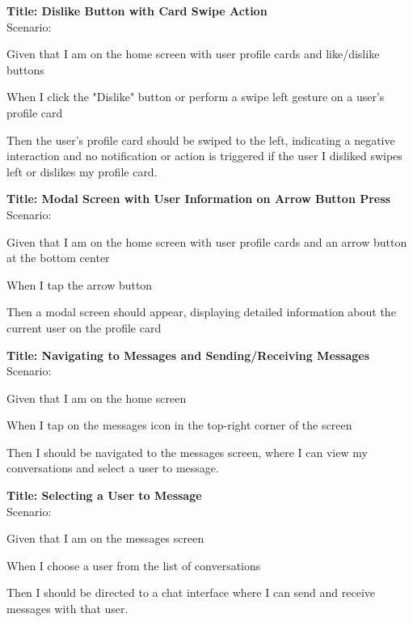 \bigskip
\textbf{Title: Dislike Button with Card Swipe Action} \\
Scenario:
\begin{compactitem}
    \item Given that I am on the home screen with user profile cards and like/dislike buttons
    \item When I click the "Dislike" button or perform a swipe left gesture on a user's profile card
    \item Then the user's profile card should be swiped to the left, indicating a negative interaction and no notification or action is triggered if the user I disliked swipes left or dislikes my profile card.
\end{compactitem}

\bigskip
\textbf{Title: Modal Screen with User Information on Arrow Button Press} \\
Scenario:
\begin{compactitem}
    \item Given that I am on the home screen with user profile cards and an arrow button at the bottom center
    \item When I tap the arrow button
    \item Then a modal screen should appear, displaying detailed information about the current user on the profile card
\end{compactitem}

\bigskip
\textbf{Title: Navigating to Messages and Sending/Receiving Messages} \\
Scenario:
\begin{compactitem}
    \item Given that I am on the home screen
    \item When I tap on the messages icon in the top-right corner of the screen
    \item Then I should be navigated to the messages screen, where I can view my conversations and select a user to message.
\end{compactitem}

\bigskip
\textbf{Title: Selecting a User to Message} \\
Scenario:
\begin{compactitem}
    \item Given that I am on the messages screen
    \item When I choose a user from the list of conversations
    \item Then I should be directed to a chat interface where I can send and receive messages with that user.
\end{compactitem}

